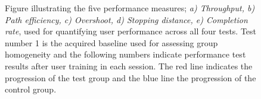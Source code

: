 \begin{figure}[H] 
	\hspace{-0.5cm}
	\hspace{-0.5cm}
	\hspace{-0.5cm}
	\hspace{-0.5cm}
	\caption{Figure illustrating the five performance measures; \textit{ a) Throughput, b) Path efficiency, c) Overshoot, d) Stopping distance, e) Completion rate}, used for quantifying user performance across all four tests. Test number 1 is the acquired baseline used for assessing group homogeneity and the following numbers indicate performance test results after user training in each session. The red line indicates the progression of the test group and the blue line the progression of the control group.}
	\label{thereIsnoFigRefYet}

\end{figure}



